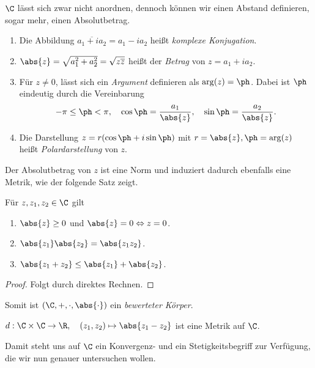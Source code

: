 $\C$ lässt sich zwar nicht anordnen, dennoch können wir einen Abstand
definieren, sogar mehr, einen Absolutbetrag.

\begin{defn}
\label{defn:2.3}
\begin{enumerate}
  \item Die Abbildung $\overline{a_1+ia_2} = a_1-ia_2$ heißt \emph{komplexe
  Konjugation}.
  \item $\abs{z} = \sqrt{a_1^2+a_2^2} = \sqrt{z\overline{z}}$ heißt der
  \emph{Betrag} von $z=a_1+ia_2$.
  \item Für $z\neq 0$, lässt sich ein \emph{Argument} definieren als $\arg(z) =
  \ph$. Dabei ist $\ph$ eindeutig
  durch die Vereinbarung
  \begin{align*}
  -\pi \le \ph < \pi,\quad \cos \ph = \frac{a_1}{\abs{z}},\quad \sin \ph =
  \frac{a_2}{\abs{z}}.
  \end{align*}
  \item Die Darstellung $z=r(\cos \ph + i\sin\ph)$ mit $r=\abs{z}, \ph=\arg(z)$
  heißt \emph{Polardarstellung} von $z$.\fishhere
\end{enumerate}
\end{defn}

Der Absolutbetrag von $z$ ist eine Norm und induziert dadurch ebenfalls eine
Metrik, wie der folgende Satz zeigt.

\begin{prop}
\label{prop:2.4}
Für $z,z_1,z_2\in\C$ gilt
\begin{enumerate}
  \item $\abs{z} \ge 0$ und $\abs{z} = 0 \Leftrightarrow z = 0$.
  \item $\abs{z_1}\abs{z_2} = \abs{z_1z_2}$.
  \item $\abs{z_1+z_2} \le  \abs{z_1} + \abs{z_2}$.\fishhere
\end{enumerate}
\end{prop}
\begin{proof}
Folgt durch direktes Rechnen.\qedhere
\end{proof}

Somit ist $(\C,+,\cdot,\abs{\cdot})$ ein \emph{bewerteter Körper}.

\begin{cor}
\label{prop:2.5}
$d: \C\times\C \to \R,\quad (z_1,z_2) \mapsto \abs{z_1-z_2}$ ist eine Metrik auf
$\C$.\fishhere
\end{cor}

Damit steht uns auf $\C$ ein Konvergenz- und ein Stetigkeitsbegriff zur
Verfügung, die wir nun genauer untersuchen wollen.

